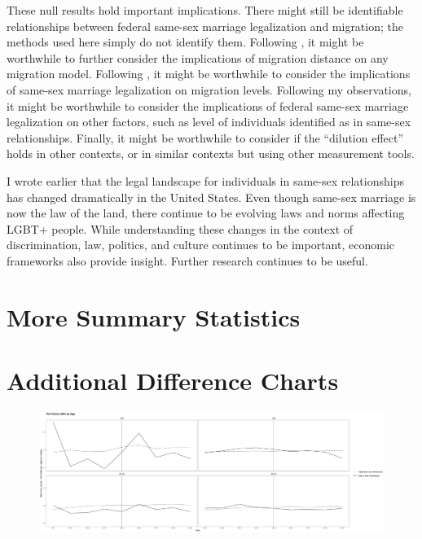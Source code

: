 \documentclass[12pt,letterpaper]{article}
\begin{document}
These null results hold important implications. There might still be identifiable relationships between federal same-sex marriage legalization and migration; the methods used here simply do not identify them. Following \citet{1, 12}, it might be worthwhile to further consider the implications of migration distance on any migration model. Following \citet{15}, it might be worthwhile to consider the implications of same-sex marriage legalization on migration levels. Following my observations, it might be worthwhile to consider the implications of federal same-sex marriage legalization on other factors, such as level of individuals identified as in same-sex relationships. Finally, it might be worthwhile to consider if the “dilution effect” holds in other contexts, or in similar contexts but using other measurement tools.

I wrote earlier that the legal landscape for individuals in same-sex relationships has changed dramatically in the United States. Even though same-sex marriage is now the law of the land, there continue to be evolving laws and norms affecting LGBT+ people. While understanding these changes in the context of discrimination, law, politics, and culture continues to be important, economic frameworks also provide insight. Further research continues to be useful.

\newpage



\newpage
\appendix
\FloatBarrier
\section{More Summary Statistics}



\begin{landscape}

\end{landscape}


\FloatBarrier
\newpage
\section{Additional Difference Charts}
\begin{figure}[htbp]
    \centering
    \includegraphics[width=0.75\linewidth]{outputs/summary_stats/age_post_diffs.png}
    \caption{}
    \label{}
\end{figure}
\end{document}
